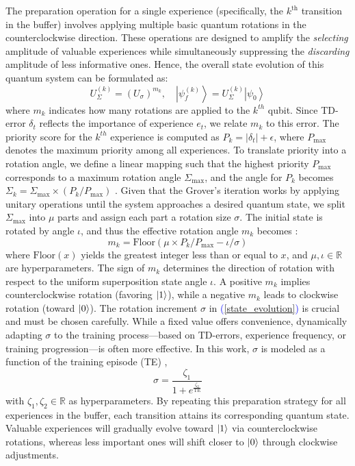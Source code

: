 \documentclass[journal]{IEEEtran}
\begin{document}
The preparation operation for a single experience (specifically, the $k^{\text{th}}$ transition in the buffer) involves applying multiple basic quantum rotations in the counterclockwise direction. These operations are designed to amplify the \textit{selecting} amplitude of valuable experiences while simultaneously suppressing the \textit{discarding} amplitude of less informative ones. Hence, the overall state evolution of this quantum system can be formulated as:
\begin{equation} U_{\Sigma }^{(k)}=\left ({U_{\sigma }}\right)^{m_{k}},\quad \left |{\psi _{f}^{(k)}}\right \rangle =U_{\Sigma }^{(k)} \left |{\psi _{0}}\right \rangle \label{state_evolution}
\end{equation}
where $m_k$ indicates how many rotations are applied to the $k^{th}$ qubit. Since TD-error $\delta_t$ reflects the importance of experience $e_t$, we relate $m_k$ to this error. The priority score for the $k^{th}$ experience is computed as $P_k = |\delta_t| + \epsilon$, where $P_{\text{max}}$ denotes the maximum priority among all experiences.
To translate priority into a rotation angle, we define a linear mapping such that the highest priority $P_{\text{max}}$ corresponds to a maximum rotation angle $\Sigma_{\text{max}}$, and the angle for $P_k$ becomes $\Sigma_k = \Sigma_{\text{max}} \times (P_k / P_{\text{max}})$ \cite{9357477}. Given that the Grover's iteration works by applying unitary operations until the system approaches a desired quantum state, we split $\Sigma_{\text{max}}$ into $\mu$ parts and assign each part a rotation size $\sigma$. The initial state is rotated by angle $\iota$, and thus the effective rotation angle $m_k$ becomes \cite{9357477}:
\begin{equation} 
    m_{k}=\text {Floor}\left ({\mu \times P_{k}/P_{\max }-\iota /\sigma }\right) \label{m_k_value}
\end{equation}
where $\text{Floor}(x)$ yields the greatest integer less than or equal to $x$, and $\mu, \iota \in \mathbb{R}$ are hyperparameters. The sign of $m_k$ determines the direction of rotation with respect to the uniform superposition state angle $\iota$. A positive $m_k$ implies counterclockwise rotation (favoring $\ket{1}$), while a negative $m_k$ leads to clockwise rotation (toward $\ket{0}$).
The rotation increment $\sigma$ in \textcolor{blue}{(\ref{state_evolution})} is crucial and must be chosen carefully. While a fixed value offers convenience, dynamically adapting $\sigma$ to the training process—based on TD-errors, experience frequency, or training progression—is often more effective. In this work, $\sigma$ is modeled as a function of the training episode (TE) \cite{9357477}, 
\begin{equation} 
    \sigma = \frac {\zeta _{1}}{1+e^{\frac {\zeta _{2}}{\mathrm{TE}}}} \label{sigma_exp}
\end{equation}
with $\zeta_1, \zeta_2 \in \mathbb{R}$ as hyperparameters.
By repeating this preparation strategy for all experiences in the buffer, each transition attains its corresponding quantum state. Valuable experiences will gradually evolve toward $\ket{1}$ via counterclockwise rotations, whereas less important ones will shift closer to $\ket{0}$ through clockwise adjustments.
\end{document}
